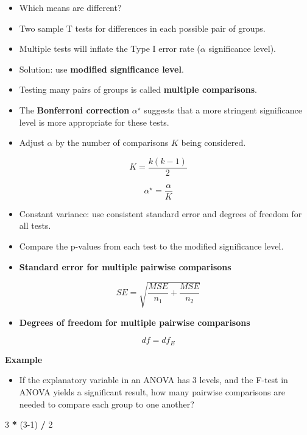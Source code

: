 \documentclass[]{book}
\newenvironment{Shaded}{\begin{snugshade}}{\end{snugshade}}
\newcommand{\DecValTok}[1]{\textcolor[rgb]{0.00,0.00,0.81}{#1}}
\newcommand{\NormalTok}[1]{#1}
\newcommand{\OperatorTok}[1]{\textcolor[rgb]{0.81,0.36,0.00}{\textbf{#1}}}
\newcommand{\StringTok}[1]{\textcolor[rgb]{0.31,0.60,0.02}{#1}}
\providecommand{\tightlist}{%
  \setlength{\itemsep}{0pt}\setlength{\parskip}{0pt}}
\begin{document}
\begin{itemize}
\item
  Which means are different?
\item
  Two sample T tests for differences in each possible pair of groups.
\item
  Multiple tests will inflate the Type I error rate (\(\alpha\) significance level).
\item
  Solution: use \textbf{modified significance level}.
\item
  Testing many pairs of groups is called \textbf{multiple comparisons}.
\item
  The \textbf{Bonferroni correction} \(\alpha^\star\) suggests that a more stringent significance level is more appropriate for these tests.
\item
  Adjust \(\alpha\) by the number of comparisons \(K\) being considered.
\end{itemize}

\[
K = \frac{k(k-1)}{2}
\]

\[
\alpha^\star = \frac{\alpha}{K}
\]

\begin{itemize}
\item
  Constant variance: use consistent standard error and degrees of freedom for all tests.
\item
  Compare the p-values from each test to the modified significance level.
\item
  \textbf{Standard error for multiple pairwise comparisons}
\end{itemize}

\[
SE = \sqrt{
\frac{MSE}{n_1} + \frac{MSE}{n_2}
}
\]

\begin{itemize}
\tightlist
\item
  \textbf{Degrees of freedom for multiple pairwise comparisons}
\end{itemize}

\[
df = df_E
\]

\textbf{Example}

\begin{itemize}
\tightlist
\item
  If the explanatory variable in an ANOVA has 3 levels, and the F-test in ANOVA yields a significant result, how many pairwise comparisons are needed to compare each group to one another?
\end{itemize}

\begin{Shaded}
\begin{Highlighting}[]
\DecValTok{3} \OperatorTok{*}\StringTok{ }\NormalTok{(}\DecValTok{3-1}\NormalTok{) }\OperatorTok{/}\StringTok{ }\DecValTok{2}
\end{Highlighting}
\end{Shaded}
\end{document}
